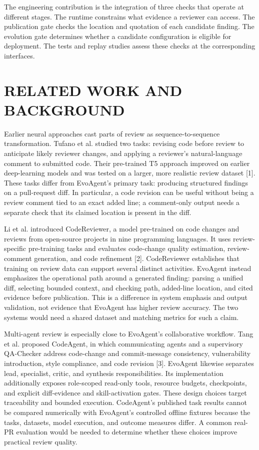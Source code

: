 \documentclass[journal,compsoc]{IEEEtran}
\begin{document}
The engineering contribution is the integration of three checks that operate at different stages. The runtime constrains what evidence a reviewer can access. The publication gate checks the location and quotation of each candidate finding. The evolution gate determines whether a candidate configuration is eligible for deployment. The tests and replay studies assess these checks at the corresponding interfaces.

\section{RELATED WORK AND BACKGROUND}
Earlier neural approaches cast parts of review as sequence-to-sequence transformation. Tufano et al. studied two tasks: revising code before review to anticipate likely reviewer changes, and applying a reviewer’s natural-language comment to submitted code. Their pre-trained T5 approach improved on earlier deep-learning models and was tested on a larger, more realistic review dataset [1]. These tasks differ from EvoAgent’s primary task: producing structured findings on a pull-request diff. In particular, a code revision can be useful without being a review comment tied to an exact added line; a comment-only output needs a separate check that its claimed location is present in the diff.

Li et al. introduced CodeReviewer, a model pre-trained on code changes and reviews from open-source projects in nine programming languages. It uses review-specific pre-training tasks and evaluates code-change quality estimation, review-comment generation, and code refinement [2]. CodeReviewer establishes that training on review data can support several distinct activities. EvoAgent instead emphasizes the operational path around a generated finding: parsing a unified diff, selecting bounded context, and checking path, added-line location, and cited evidence before publication. This is a difference in system emphasis and output validation, not evidence that EvoAgent has higher review accuracy. The two systems would need a shared dataset and matching metrics for such a claim.

Multi-agent review is especially close to EvoAgent’s collaborative workflow. Tang et al. proposed CodeAgent, in which communicating agents and a supervisory QA-Checker address code-change and commit-message consistency, vulnerability introduction, style compliance, and code revision [3]. EvoAgent likewise separates lead, specialist, critic, and synthesis responsibilities. Its implementation additionally exposes role-scoped read-only tools, resource budgets, checkpoints, and explicit diff-evidence and skill-activation gates. These design choices target traceability and bounded execution. CodeAgent’s published task results cannot be compared numerically with EvoAgent’s controlled offline fixtures because the tasks, datasets, model execution, and outcome measures differ. A common real-PR evaluation would be needed to determine whether these choices improve practical review quality.
\end{document}
